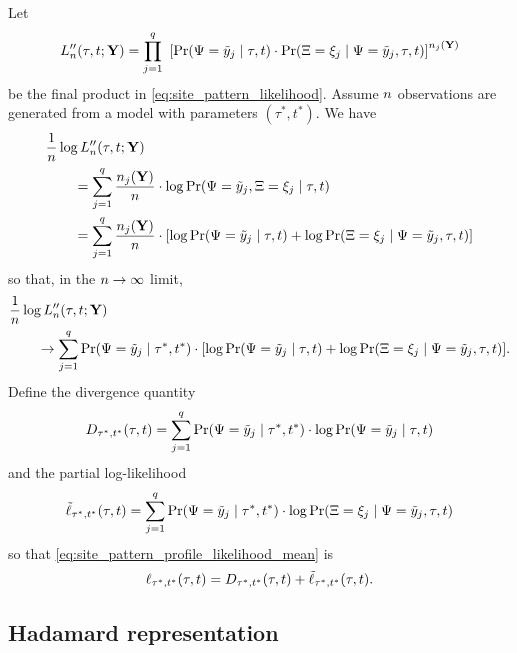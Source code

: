 Let
$$
L_n''(\tau, t; \mathbf{Y}) = \prod_{j=1}^{q} \ \left[\Pr(\Psi=\tilde{y}_j \mid \tau, t) \cdot \Pr(\Xi=\xi_j \mid \Psi=\tilde{y}_j, \tau, t)\right] ^{n_j(\mathbf{Y})}
$$
be the final product in \eqref{eq:site_pattern_likelihood}.
Assume $n$ observations are generated from a model with parameters $(\tau^*, t^*)$.
We have
\begin{equation*}
\begin{split}
&    \frac{1}{n} \log L_n''(\tau, t; \mathbf{Y}) \\
&\qquad = \sum_{j=1}^q \frac{n_j(\mathbf{Y})}{n}\cdot  \log \Pr(\Psi=\tilde{y}_j, \Xi=\xi_j \mid \tau, t) \\
&\qquad = \sum_{j=1}^q \frac{n_j(\mathbf{Y})}{n}\cdot [\log \Pr(\Psi=\tilde{y}_j \mid \tau, t) +
            \log \Pr(\Xi=\xi_j \mid \Psi=\tilde{y}_j , \tau, t)]
\end{split}
\end{equation*}
so that, in the $n\rightarrow\infty$ limit,
\begin{equation}
\begin{split}
&    \frac{1}{n} \log L_n''(\tau, t; \mathbf{Y}) \\
&\qquad \rightarrow \sum_{j=1}^q \Pr(\Psi=\tilde{y}_j \mid \tau^*, t^*) \cdot [\log \Pr(\Psi=\tilde{y}_j \mid \tau, t) + \log \Pr(\Xi=\xi_j \mid \Psi=\tilde{y}_j , \tau, t)]. \label{eq:site_pattern_profile_likelihood_mean}
\end{split}
\end{equation}
Define the divergence quantity
$$
D_{\tau^*,t^*}(\tau,t) = \sum_{j=1}^q \Pr(\Psi=\tilde{y}_j \mid \tau^*, t^*)\cdot\log \Pr(\Psi=\tilde{y}_j \mid \tau, t)
$$
and the partial log-likelihood
$$
\tilde{\ell}_{\tau^*,t^*}(\tau, t) = \sum_{j=1}^q \Pr(\Psi=\tilde{y}_j \mid \tau^*, t^*)\cdot\log \Pr(\Xi=\xi_j \mid \Psi = \tilde{y}_j, \tau, t)
$$
so that \eqref{eq:site_pattern_profile_likelihood_mean} is
\begin{equation}
    \label{eq:log_likelihood_simplified}
    \ell_{\tau^*,t^*}(\tau, t) = D_{\tau^*,t^*}(\tau,t) + \tilde{\ell}_{\tau^*,t^*}(\tau, t).
\end{equation}

\subsection*{Hadamard representation}

